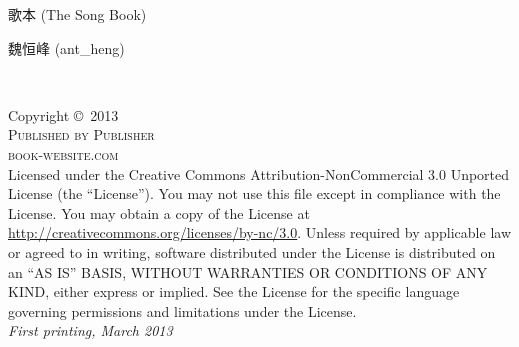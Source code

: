\documentclass[11pt,fleqn]{book} %
\begin{document}
\begin{CJK*}{UTF8}{gbsn}

\begingroup
\thispagestyle{empty}
\centering
\vspace*{9cm}
\par\normalfont\fontsize{35}{35}\sffamily\selectfont
歌本 (The Song Book)\par %
\vspace*{1cm}
{\Huge 魏恒峰 (ant\_heng)}\par %
\endgroup


\newpage
~\vfill
\thispagestyle{empty}

\noindent Copyright \copyright\ 2013 \\ %

\noindent \textsc{Published by Publisher}\\ %

\noindent \textsc{book-website.com}\\ %

\noindent Licensed under the Creative Commons Attribution-NonCommercial 3.0
Unported License (the ``License''). You may not use this file except in
compliance with the License. You may obtain a copy of the License at
\url{http://creativecommons.org/licenses/by-nc/3.0}. Unless required
by applicable law or agreed to in writing, software distributed under
the License is distributed on an \textsc{``AS IS'' BASIS, WITHOUT WARRANTIES
OR CONDITIONS OF ANY KIND}, either express or implied. See the License
for the specific language governing permissions and limitations under
the License.\\ %

\noindent \textit{First printing, March 2013} %



\end{CJK*}
\end{document}
